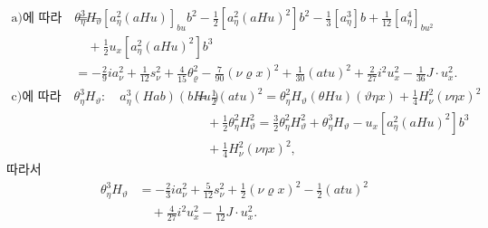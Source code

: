 
\[
\begin{aligned}
\text{a)에 따라}\quad
\theta_\eta^3H_\vartheta&=-[a_\eta^2(aHu)]_{bu}b^2-\frac12[a_\eta^2(aHu)^2]b^2-\frac13[a_\eta^3]b+\frac1{12}[a_\eta^4]_{bu^2}\\
&\quad+\frac12u_x[a_\eta^2(aHu)^2]b^3\\
&=-\frac29ia_\nu^2+\frac1{12}s_\nu^2+\frac4{15}\theta_\varrho^2-\frac7{90}(\nu\varrho x)^2+\frac1{30}(atu)^2+\frac2{27}i^2u_x^2-\frac1{36}J\cdot u_x^2.
\end{aligned}
\]
\[
\begin{aligned}
\text{c)에 따라}\quad
\theta_\eta^3H_\vartheta:\quad a_\eta^3(Hab)(bHu)&=\frac12(atu)^2
=\theta_\eta^2H_\vartheta(\theta Hu)(\vartheta\eta x)+\frac14H_\nu^2(\nu\eta x)^2\\
&\quad+\frac12\theta_\eta^2H_\vartheta^2
=\frac32\theta_\eta^2H_\vartheta^2+\theta_\eta^3H_\vartheta-u_x[a_\eta^2(aHu)^2]b^3\\
&\quad+\frac14H_\nu^2(\nu\eta x)^2,
\end{aligned}
\]
따라서
\[
\begin{aligned}
\theta_\eta^3H_\vartheta&=-\frac23ia_\nu^2+\frac5{12}s_\nu^2+\frac12(\nu\varrho x)^2-\frac12(atu)^2\\
&\quad+\frac4{27}i^2u_x^2-\frac1{12}J\cdot u_x^2.
\end{aligned}
\]
